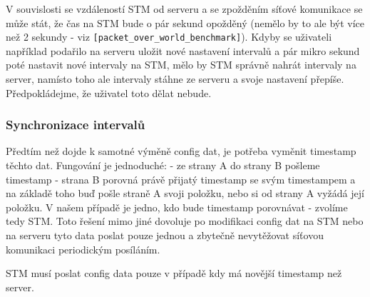 V souvislosti se vzdáleností STM od serveru a se zpožděním síťové komunikace se může
stát, že čas na STM bude o pár sekund opožděný (nemělo by to ale být více než 2 sekundy -
viz \texttt{[packet\_over\_world\_benchmark]}).
Kdyby se uživateli například podařilo na serveru uložit nové nastavení intervalů
a pár mikro sekund poté nastavit nové intervaly na STM, mělo by STM správně nahrát
intervaly na server, namísto toho ale intervaly stáhne ze serveru a svoje nastavení přepíše.
Předpokládejme, že uživatel toto dělat nebude.

\subsubsection{Synchronizace intervalů}


Předtím než dojde k samotné výměně config dat, je potřeba vyměnit timestamp těchto dat.
Fungování je jednoduché:
- ze strany A do strany B pošleme timestamp
- strana B porovná právě přijatý timestamp se svým timestampem a na základě toho buď pošle
    straně A svoji položku, nebo si od strany A vyžádá její položku.
V našem případě je jedno, kdo bude timestamp porovnávat - zvolíme tedy STM.
Toto řešení mimo jiné dovoluje po modifikaci config dat na STM nebo na serveru
tyto data poslat pouze jednou a zbytečně nevytěžovat síťovou komunikaci periodickým
posíláním.

STM musí poslat config data pouze v případě kdy má novější timestamp než server.




